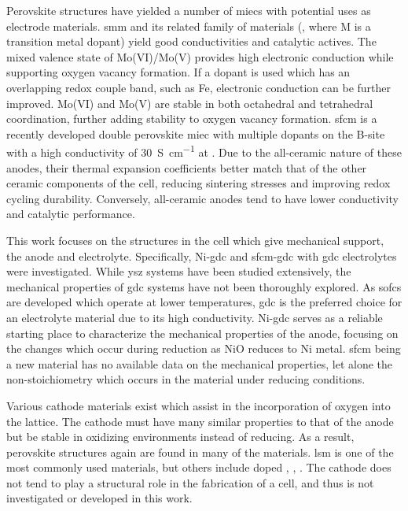     Perovskite structures have yielded a number of \glspl{miec} with potential uses as electrode materials. \cite{Yamamoto1987,Anderson1992,Ishihara2009}
    \gls{smm} and its related family of materials (, where M is a transition metal dopant) yield good conductivities and catalytic actives.\cite{Huang2009}
    The mixed valence state of Mo(VI)/Mo(V) provides high electronic conduction while supporting oxygen vacancy formation.\cite{Huang2006a}
    If a dopant is used which has an overlapping redox couple band, such as Fe, electronic conduction can be further improved.
    Mo(VI) and Mo(V) are stable in both octahedral and tetrahedral coordination, further adding stability to oxygen vacancy formation.\cite{Bernuy-Lopez2007}
    \gls{sfcm} is a recently developed double perovskite \gls{miec} with multiple dopants on the B-site with a high conductivity of \SI{30}{S\per\centi\meter} at .\cite{Pan,Hussaina,Hussain}
    Due to the all-ceramic nature of these anodes, their thermal expansion coefficients better match that of the other ceramic components of the cell, reducing sintering stresses and improving redox cycling durability.\cite{Goodenough2007}
    Conversely, all-ceramic anodes tend to have lower conductivity and catalytic performance.\cite{Zhang2012}

    This work focuses on the structures in the cell which give mechanical support, the anode and electrolyte.
    Specifically, Ni-\gls{gdc} and \gls{sfcm}-\gls{gdc} with \gls{gdc} electrolytes were investigated.
    While \gls{ysz} systems have been studied extensively, the mechanical properties of \gls{gdc} systems have not been thoroughly  explored.
    As \glspl{sofc} are developed which operate at lower temperatures, \gls{gdc} is the preferred choice for an electrolyte material due to its high conductivity.
    Ni-\gls{gdc} serves as a reliable starting place to characterize the mechanical properties of the anode, focusing on the changes which occur during reduction as NiO reduces to Ni metal.
    \gls{sfcm} being a new material has no available data on the mechanical properties, let alone the non-stoichiometry which occurs in the material under reducing conditions.

    Various cathode materials exist which assist in the incorporation of oxygen into the lattice.
    The cathode must have many similar properties to that of the anode but be stable in oxidizing environments instead of reducing.
    As a result, perovskite structures again are found in many of the materials.
    \Gls{lsm} is one of the most commonly used materials, but others include doped , , . \cite{Minh2004, Cascos2016, Chen2015, Kuhn2013}
    The cathode does not tend to play a structural role in the fabrication of a cell, and thus is not investigated or developed in this work.

